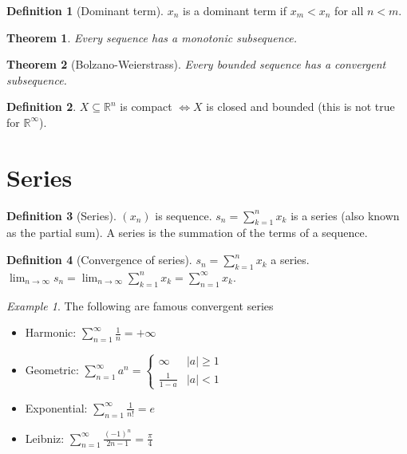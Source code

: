 \documentclass{article}
\newcommand{\DS}{\displaystyle}
\newcommand{\abs}[1]{\left|#1\right|}
\newcommand{\limn}{\lim_{n \to \infty}}
\theoremstyle{definition}
\newtheorem{definition}{Definition}[section]
\theoremstyle{definition}
\theoremstyle{plain}
\newtheorem{theorem}{Theorem}[section]
\theoremstyle{plain}
\theoremstyle{plain}
\theoremstyle{plain}
\theoremstyle{definition}
\theoremstyle{remark}
\newtheorem{exampled}{Example}[definition]
\theoremstyle{remark}
\theoremstyle{remark}
\theoremstyle{remark}
\newcommand{\R}{\mathbb{R}}
\newcommand{\sumn}{\sum_{k=1}^n}
\newcommand{\series}{\sum_{n=1}^\infty}
\begin{document}
\begin{definition}[Dominant term]
  $x_n$ is a dominant term if $x_m < x_n$ for all $n < m$.
\end{definition}


\begin{theorem}
  Every sequence has a monotonic subsequence.
\end{theorem}



\begin{theorem}[Bolzano-Weierstrass]
  Every bounded sequence has a convergent subsequence.
\end{theorem}



\begin{definition}
  $X \subseteq \R^n$ is compact $\iff X$ is closed and bounded (this is not true for $\R^\infty$).
\end{definition}


\section{Series}


\begin{definition}[Series]
  $(x_n)$ is sequence. $\DS s_n = \sumn{x_k}$ is a series (also known as the partial sum). A series is the summation of the terms of a sequence.
\end{definition}


\begin{definition}[Convergence of series]
  $\DS s_n = \sumn{x_k}$ a series. $\DS \limn s_n = \limn \sumn{x_k} = \series{x_k}$.
\end{definition}

\begin{exampled}
  The following are famous convergent series
  \begin{itemize}
    \item Harmonic: $\DS \series{\frac{1}{n}} = +\infty$
    \item Geometric: $\DS \series{a^n} = \begin{cases}
    \infty & \abs{a} \geq 1 \\ \frac{1}{1-a} & \abs{a} < 1\end{cases}$
    \item Exponential: $\DS \series{\frac{1}{n!}} = e$
    \item Leibniz: $\DS \series{\frac{(-1)^n}{2n-1}} = \frac{\pi}{4}$
  \end{itemize}
\end{exampled}
\end{document}
